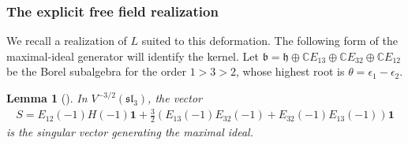 \documentclass[11pt]{amsart}
\newtheorem{lemma}[theorem]{Lemma}
\theoremstyle{definition}
\theoremstyle{remark}
\begin{document}
\subsubsection{The explicit free field realization}
We recall a realization of $L$ suited to this deformation. The following
form of the maximal-ideal generator will identify the kernel. Let $\mathfrak b=\mathfrak h\oplus\mathbb C E_{13}\oplus\mathbb C E_{32}\oplus\mathbb C E_{12}$ be the
Borel subalgebra for the order $1>3>2$, whose highest root is $\theta=\epsilon_1-\epsilon_2$. \begin{lemma}[\cite{PerseA}]
In $V^{-3/2}(\mathfrak{sl}_3)$, the vector
\begin{align*}
	S=E_{12}(-1)H(-1)\mathbf{1}+\frac32(E_{13}(-1)E_{32}(-1)+E_{32}(-1)E_{13}(-1))\mathbf{1}
\end{align*}	
is the singular vector generating the maximal ideal. 
\end{lemma}
\end{document}
